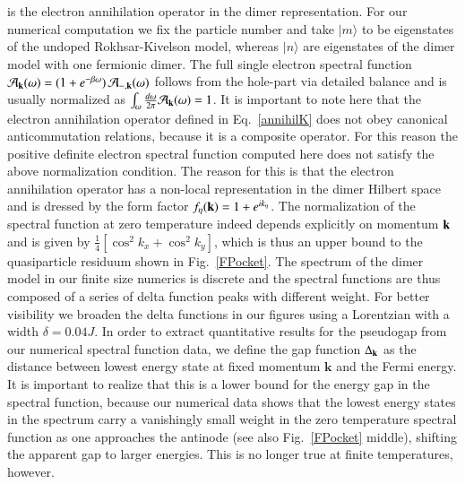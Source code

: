 \documentclass[aps,pra,reprint,showpacs,superscriptaddress]{revtex4-1}
\begin{document}
is the electron annihilation operator in the dimer representation. For our numerical computation we fix the particle number and take $|m\rangle$ to be eigenstates of the undoped Rokhsar-Kivelson model, whereas $|n\rangle$ are eigenstates of the dimer model with one fermionic dimer. The full single electron spectral function $\mathcal{A}_{\bold{k}}(\omega) = (1+e^{-\beta \omega}) \, \mathcal{A}_{-,\bold{k}}(\omega)$ follows from the hole-part via detailed balance and is usually normalized as $\int_{\omega} \frac{d\omega}{2\pi}\mathcal{A}_{\bold{k}}(\omega)=1$. It is important to note here that the electron annihilation operator defined in Eq.~\eqref{annihilK} does not obey canonical anticommutation relations, because it is a composite operator. For this reason the positive definite electron spectral function computed here does not satisfy the above normalization condition. The reason for this is that the electron annihilation operator has a non-local representation in the dimer Hilbert space and is dressed by the form factor $f_{\eta} (\bold{k}) = 1+e^{i k_{\eta}}$. The normalization of the spectral function at zero temperature indeed depends explicitly on momentum $\bold{k}$ and is given by $\tfrac{1}{4} [\cos^2{k_x} + \cos^2{k_y}]$, which is thus an upper bound to the quasiparticle residuum shown in Fig.~\ref{FPocket}. The spectrum of the dimer model in our finite size numerics is discrete and the spectral functions are thus composed of a series of delta function peaks with different weight. For better visibility we broaden the delta functions in our figures using a Lorentzian with a width $\delta = 0.04 J$. In order to extract quantitative results for the pseudogap from our numerical spectral function data, we define the gap function $\Delta_{\bold{k}}$ as the distance between lowest energy state at fixed momentum $\mathbf{k}$ and the Fermi energy. It is important to realize that this is a lower bound for the energy gap in the spectral function, because our numerical data shows that the lowest energy states in the spectrum carry a vanishingly small weight in the zero temperature spectral function as one approaches the antinode (see also Fig.~\ref{FPocket} middle), shifting the apparent gap to larger energies. This is no longer true at finite temperatures, however.
\end{document}

